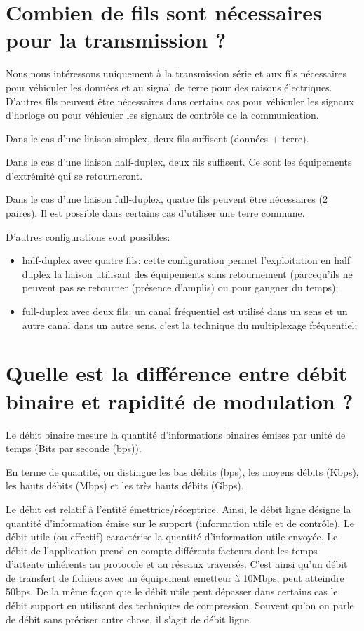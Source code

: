 \section{Combien de fils sont nécessaires pour la transmission ?}
Nous nous intéressons uniquement à la transmission série et aux fils nécessaires pour
véhiculer les données et au signal de terre pour des raisons électriques. D'autres fils
peuvent être nécessaires dans certains cas pour véhiculer les signaux d'horloge ou pour
véhiculer les signaux de contrôle de la communication.

Dans le cas d'une liaison simplex, deux fils suffisent (données + terre).

Dans le cas d'une liaison half-duplex, deux fils suffisent. Ce sont les équipements
d'extrémité qui se retourneront.

Dans le cas d'une liaison full-duplex, quatre fils peuvent être nécessaires (2 paires). Il est
possible dans certains cas d'utiliser une terre commune.

D'autres configurations sont possibles:

\begin{itemize}
	\item half-duplex avec quatre fils: cette configuration permet l'exploitation en half duplex la
liaison utilisant des équipements sans retournement (parcequ'ils ne peuvent pas se retourner
(présence d'amplis) ou pour gangner du temps);
\item full-duplex avec deux fils: un canal fréquentiel est utilisé dans un sens et un autre canal
dans un autre sens. c'est la technique du multiplexage fréquentiel;
\end{itemize}


\section{Quelle est la différence entre débit binaire et rapidité de modulation ?}
Le débit binaire mesure la quantité d'informations binaires émises par unité de temps (Bits
par seconde (bps)).

En terme de quantité, on distingue les bas débits (bps), les moyens débits (Kbps), les hauts
débits (Mbps) et les très hauts débits (Gbps).

Le débit est relatif à l'entité émettrice/réceptrice. Ainsi, le débit ligne désigne la
quantité d'information émise sur le support (information utile et de contrôle). Le débit utile
(ou effectif) caractérise la quantité d'information utile envoyée. Le débit de l'application
prend en compte différents facteurs dont les temps d'attente inhérents au protocole et au
réseaux traversés. C'est ainsi qu'un débit de transfert de fichiers avec un équipement
emetteur à 10Mbps, peut atteindre 50bps. De la même façon que le débit utile peut dépasser
dans certains cas le débit support en utilisant des techniques de compression. Souvent qu'on
on parle de débit sans préciser autre chose, il s'agit de débit ligne.

